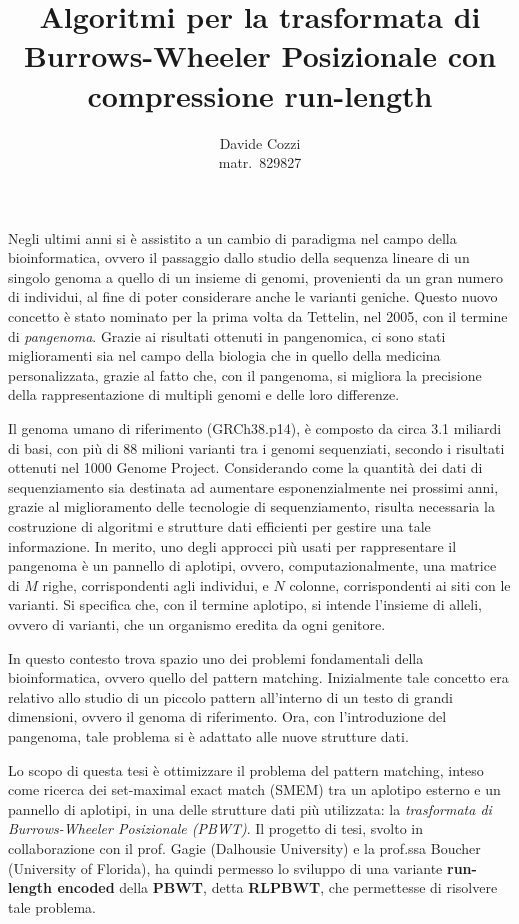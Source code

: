 \documentclass[a4paper,11pt, oneside,italian]{article}
\title{Algoritmi per la trasformata di Burrows-Wheeler
  Posizionale con compressione run-length}
\author{Davide Cozzi\\\smaller matr.~829827}
\date{}
\begin{document}
\maketitle
{}
\noindent
Negli ultimi anni si è assistito a un cambio di paradigma nel campo della
bioinformatica, ovvero il passaggio dallo studio della sequenza lineare di un
singolo genoma a quello di un insieme di genomi, provenienti da un gran numero
di individui, al fine di poter considerare anche le varianti
  geniche. Questo nuovo concetto è stato nominato per la prima volta da
Tettelin, nel 2005, con il termine di \textit{pangenoma}. Grazie ai risultati
ottenuti in pangenomica, ci sono stati miglioramenti sia nel 
campo della biologia che in quello della medicina personalizzata, grazie al
fatto che, con il pangenoma, si migliora la precisione della rappresentazione di
multipli genomi e delle loro differenze. 

Il genoma umano di riferimento (GRCh38.p14), è composto da circa
3.1 miliardi di basi, con più di 88 milioni 
varianti tra i genomi sequenziati, secondo i risultati ottenuti nel 1000 Genome
Project. Considerando come la quantità dei dati di sequenziamento sia destinata
ad aumentare esponenzialmente nei prossimi anni, grazie al
miglioramento delle tecnologie di sequenziamento, risulta necessaria la
costruzione di algoritmi e   
strutture dati efficienti per gestire una tale informazione. 
In merito, uno degli approcci più usati per rappresentare il pangenoma è un
pannello di aplotipi, ovvero, computazionalmente, una matrice di $M$
righe, corrispondenti agli individui, e $N$ colonne, corrispondenti ai siti con
le varianti. Si specifica che, con il termine
aplotipo, si intende l'insieme di alleli, ovvero di varianti, che un organismo
eredita da ogni genitore.

In questo contesto trova spazio uno dei problemi fondamentali della
bioinformatica, ovvero quello del pattern matching. Inizialmente tale concetto
  era relativo allo studio di un piccolo pattern all'interno di un testo di
  grandi dimensioni, ovvero il genoma di riferimento. Ora, con l'introduzione 
del pangenoma, tale problema si è adattato alle nuove strutture
dati.

Lo scopo di questa tesi è ottimizzare il problema del pattern 
matching, inteso come ricerca dei set-maximal exact match (SMEM) tra un aplotipo
esterno e un pannello di aplotipi, in una delle 
strutture dati più utilizzata: la \textit{trasformata di Burrows-Wheeler
  Posizionale (PBWT)}. Il progetto di tesi, svolto in collaborazione con il
prof. Gagie (Dalhousie University) e la prof.ssa Boucher 
(University of Florida), ha quindi permesso lo sviluppo di una variante
\textbf{run-length encoded} della \textbf{PBWT}, detta \textbf{RLPBWT}, che
permettesse di risolvere tale problema.
\end{document}
